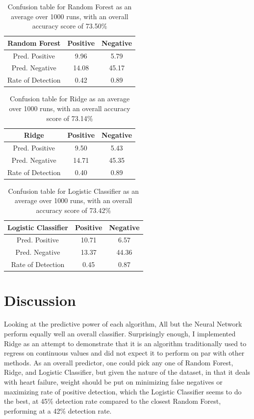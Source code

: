 \documentclass[a4paper, UKenglish]{article}
\newcommand{\0}{\mathbf{0}}
\newcommand{\1}{\mathbf{1}}
\begin{document}
\begin{table}[H]
\centering
\caption{Confusion table for Random Forest as an average over 1000 runs, with an overall accuracy score of 73.50{\%}}
\label{tab:Random Forest}
\begin{tabular}{|c||c|c|}
\hline
Random Forest       & Positive   & Negative   \\
\hline
\hline
Pred. Positive & 9.96  & 5.79 \\
\hline
Pred. Negative & 14.08 & 45.17  \\
\hline
\hline
Rate of Detection & 0.42 & 0.89 \\
\hline
\end{tabular}
\end{table}


\begin{table}[H]
\centering
\caption{Confusion table for Ridge as an average over 1000 runs, with an overall accuracy score of 73.14{\%}}
\label{tab:Ridge}
\begin{tabular}{|c||c|c|}
\hline
Ridge       & Positive   & Negative   \\
\hline
\hline
Pred. Positive & 9.50  & 5.43 \\
\hline
Pred. Negative & 14.71 & 45.35  \\
\hline
\hline
Rate of Detection & 0.40 & 0.89 \\
\hline
\end{tabular}
\end{table}


\begin{table}[H]
\centering
\caption{Confusion table for Logistic Classifier as an average over 1000 runs, with an overall accuracy score of 73.42{\%}}
\label{tab:Logistic Classifier}
\begin{tabular}{|c||c|c|}
\hline
Logistic Classifier       & Positive   & Negative   \\
\hline
\hline
Pred. Positive & 10.71  & 6.57 \\
\hline
Pred. Negative & 13.37 & 44.36  \\
\hline
\hline
Rate of Detection & 0.45 & 0.87 \\
\hline
\end{tabular}
\end{table}

\section{Discussion}
Looking at the predictive power of each algorithm, All but the Neural Network perform equally well an overall classifier. Surprisingly enough, I implemented Ridge as an attempt to demonstrate that it is an algorithm traditionally used to regress on continuous values and did not expect it to perform on par with other methods. As an overall predictor, one could pick any one of Random Forest, Ridge, and Logistic Classifier, but given the nature of the dataset, in that it deals with heart failure, weight should be put on minimizing false negatives or maximizing rate of positive detection, which the Logistic Classifier seems to do the best, at 45\% detection rate compared to the closest Random Forest, performing at a 42\% detection rate.
\end{document}
